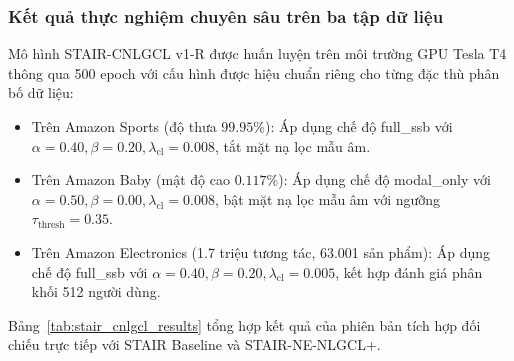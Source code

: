 \subsubsection{Kết quả thực nghiệm chuyên sâu trên ba tập dữ liệu}

Mô hình STAIR-CNLGCL v1-R được huấn luyện trên môi trường GPU Tesla T4 thông qua 500 epoch với cấu hình được hiệu chuẩn riêng cho từng đặc thù phân bố dữ liệu:
\begin{itemize}[leftmargin=*]
    \item Trên Amazon Sports (độ thưa $99.95\%$): Áp dụng chế độ full\_ssb với $\alpha = 0.40, \beta = 0.20, \lambda_{\text{cl}} = 0.008$, tắt mặt nạ lọc mẫu âm.
    \item Trên Amazon Baby (mật độ cao $0.117\%$): Áp dụng chế độ modal\_only với $\alpha = 0.50, \beta = 0.00, \lambda_{\text{cl}} = 0.008$, bật mặt nạ lọc mẫu âm với ngưỡng $\tau_{\text{thresh}} = 0.35$.
    \item Trên Amazon Electronics (1.7 triệu tương tác, 63.001 sản phẩm): Áp dụng chế độ full\_ssb với $\alpha = 0.40, \beta = 0.20, \lambda_{\text{cl}} = 0.005$, kết hợp đánh giá phân khối 512 người dùng.
\end{itemize}

Bảng~\ref{tab:stair_cnlgcl_results} tổng hợp kết quả của phiên bản tích hợp đối chiếu trực tiếp với STAIR Baseline và STAIR-NE-NLGCL+.

